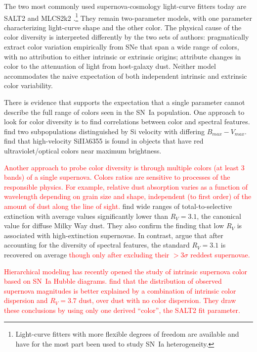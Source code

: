 \documentclass{aastex61}   	%
\begin{document}
The two most commonly used supernova-cosmology light-curve fitters today are SALT2 \citep{2007A&A...466...11G} and MLCS2k2
\citep{2007ApJ...659..122J}.\footnote{Light-curve fitters with more flexible degrees of freedom
\citep[e.g.][]{2008ApJ...681..482C, 2011AJ....141...19B, 2011ApJ...731..120M} are available and have for
the most part been used to study SN~Ia heterogeneity.}
They remain two-parameter models, with one parameter characterizing light-curve shape and the other
 color.  The physical cause of the color diversity is interpreted differently by the two sets of authors: 
\citet{2007A&A...466...11G} pragmatically extract color variation empirically from SNe that span a wide range of colors, with no attribution
to either intrinsic or extrinsic origins;
\citet{2007ApJ...659..122J}
attribute changes in color to the attenuation of light from host-galaxy dust. Neither model accommodates the naive expectation of both independent
intrinsic and extrinsic color variability.

There is evidence that supports the expectation that a single parameter cannot describe the full range
of colors seen in the SN~Ia population.  One approach to look for color diversity is to find correlations between color and spectral features.
\citet{2009ApJ...699L.139W, 2011ApJ...729...55F} find two subpopulations distinguished
by Si velocity with differing $B_{max}-V_{max}$.
\citet{2015MNRAS.451.1973S}
find that high-velocity SiII$\lambda$6355 is found in objects that have red ultraviolet/optical colors near maximum brightness.

\textcolor{red}{
Another approach to probe color diversity is through multiple colors (at least 3 bands)
of a single supernova.  Colors ratios are sensitive to processes of the responsible physics.   For example,
relative dust absorption varies as a function of wavelength depending on grain size and shape,
independent (to first order) of the amount of dust along the line of sight.
}
\citet{2014ApJ...789...32B, 2015MNRAS.453.3300A} find wide
ranges of total-to-selective extinction with average values significantly lower than $R_V = 3.1$,
the canonical value for diffuse Milky Way dust.
They also confirm the \citet{2011ApJ...729...55F} finding that low $R_V$ is associated with high-extinction supernovae.
In contrast, \citet{2011A&A...529L...4C} argue that after accounting for the diversity of spectral features,
the standard $R_V=3.1$ is recovered on average
\textcolor{red}{though only after excluding their $>3 \sigma$ reddest supernovae.}

\textcolor{red}
{
Hierarchical modeling has recently opened
the study of intrinsic supernova color based on SN~Ia Hubble diagrams.
\citet{2016arXiv160904470M} find that the distribution of
observed supernova magnitudes is better explained by a combination of intrinsic color dispersion and
$R_V=3.7$ dust, over dust with no color dispersion.
They draw these conclusions by using only one
derived ``color'', the SALT2 fit parameter.
}
\end{document}
